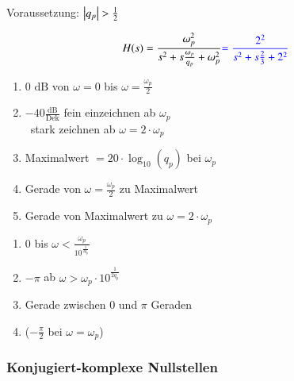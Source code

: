 \begin{minipage}[t]{0.48\columnwidth}
    \raggedright
    \begin{center}
        Voraussetzung: $\left|q_p\right| > \frac{1}{2}$
    \end{center}
    $$ H(s) = \frac{\omega_p^2}{s^2 + s \frac{\omega_p}{q_p} + \omega_p^2} {\color{blue}= \frac{2^2}{s^2 + s \frac{2}{3} + 2^2}} $$

    
\end{minipage}
\hfill
\begin{minipage}[t]{0.48\columnwidth}
        \begin{enumerate}
            \item 0 $\text{dB}$ von $\omega=0$ bis $\omega=\frac{\omega_p}{2}$
            \item $-40\frac{\text{dB}}{\text{Dek}}$ fein einzeichnen ab $\omega_p$\\
            \textrightarrow\ stark zeichnen ab $\omega = 2 \cdot \omega_p$
            \item Maximalwert $= 20\cdot \log_{10}(q_p)$ bei $\omega_p$
            \item Gerade von $\omega=\frac{\omega_p}{2}$ zu Maximalwert 
            \item Gerade von Maximalwert zu $\omega = 2 \cdot \omega_p$\\
        \end{enumerate}
        \begin{enumerate}
            \item 0 bis $\omega < \frac{\omega_p}{10^{\frac{1}{2 q_p}}}$
            \item $- \pi$ ab $\omega > \omega_p \cdot 10^{\frac{1}{2 q_p}}$
            \item Gerade zwischen $0$ und $\pi$ Geraden
            \item ($- \frac{\pi}{2}$ bei $\omega = \omega_p$)
        \end{enumerate}
\end{minipage}


\subsubsection{Konjugiert-komplexe Nullstellen} 

